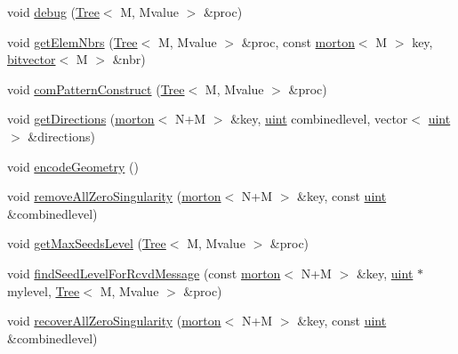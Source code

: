 \begin{DoxyCompactItemize}
\item 
void \mbox{\hyperlink{classForest_ac13e32c23aef11227af7242727db8222}{debug}} (\mbox{\hyperlink{classTree}{Tree}}$<$ M, Mvalue $>$ \&proc)
\item 
void \mbox{\hyperlink{classForest_af5a501fbaa0a516f722f8c896f00ed6b}{get\+Elem\+Nbrs}} (\mbox{\hyperlink{classTree}{Tree}}$<$ M, Mvalue $>$ \&proc, const \mbox{\hyperlink{definitions_8h_af8682350bd8bb38ee9023f7a0a310add}{morton}}$<$ M $>$ key, \mbox{\hyperlink{definitions_8h_a55821d7929f3f16aaf1466129c209492}{bitvector}}$<$ M $>$ \&nbr)
\item 
void \mbox{\hyperlink{classForest_ac2240e70c0c725c8720f2d634fdd56e5}{com\+Pattern\+Construct}} (\mbox{\hyperlink{classTree}{Tree}}$<$ M, Mvalue $>$ \&proc)
\item 
void \mbox{\hyperlink{classForest_aee0e0c05b2106c24a7327d263e178da0}{get\+Directions}} (\mbox{\hyperlink{definitions_8h_af8682350bd8bb38ee9023f7a0a310add}{morton}}$<$ N+M $>$ \&key, \mbox{\hyperlink{definitions_8h_a69aa29b598b851b0640aa225a9e5d61d}{uint}} combinedlevel, vector$<$ \mbox{\hyperlink{definitions_8h_a69aa29b598b851b0640aa225a9e5d61d}{uint}} $>$ \&directions)
\item 
void \mbox{\hyperlink{classForest_ab35e2068b9c64707eb15947713164650}{encode\+Geometry}} ()
\item 
void \mbox{\hyperlink{classForest_a85bd0fc70786ac0d45b35b5f2ef0b822}{remove\+All\+Zero\+Singularity}} (\mbox{\hyperlink{definitions_8h_af8682350bd8bb38ee9023f7a0a310add}{morton}}$<$ N+M $>$ \&key, const \mbox{\hyperlink{definitions_8h_a69aa29b598b851b0640aa225a9e5d61d}{uint}} \&combinedlevel)
\item 
void \mbox{\hyperlink{classForest_a529db5cd59d6a488c32d5107d6bcaec9}{get\+Max\+Seeds\+Level}} (\mbox{\hyperlink{classTree}{Tree}}$<$ M, Mvalue $>$ \&proc)
\item 
void \mbox{\hyperlink{classForest_a30da3b079d5b869bc416cf6856ec0fee}{find\+Seed\+Level\+For\+Rcvd\+Message}} (const \mbox{\hyperlink{definitions_8h_af8682350bd8bb38ee9023f7a0a310add}{morton}}$<$ N+M $>$ \&key, \mbox{\hyperlink{definitions_8h_a69aa29b598b851b0640aa225a9e5d61d}{uint}} $\ast$mylevel, \mbox{\hyperlink{classTree}{Tree}}$<$ M, Mvalue $>$ \&proc)
\item 
void \mbox{\hyperlink{classForest_a563e088c635b27f95fbdc4ceb82052f5}{recover\+All\+Zero\+Singularity}} (\mbox{\hyperlink{definitions_8h_af8682350bd8bb38ee9023f7a0a310add}{morton}}$<$ N+M $>$ \&key, const \mbox{\hyperlink{definitions_8h_a69aa29b598b851b0640aa225a9e5d61d}{uint}} \&combinedlevel)

\end{DoxyCompactItemize}
